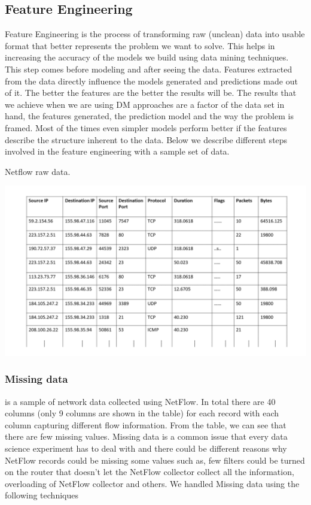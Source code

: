 \subsection{Feature Engineering}

Feature Engineering is the process of transforming raw (unclean)
data into usable format that better represents the problem we want to solve. This helps in increasing the accuracy of the models we build using data mining techniques. This step comes before modeling and after seeing the data.
Features extracted from the data directly influence the models generated and predictions made out of it. The better the features are the better the results will be. The results that we achieve when we are using DM approaches are a factor of the data set in hand, the features generated, the prediction model and the way the problem is framed. Most of the times even simpler models perform better if the features describe the structure inherent to the data. 
Below we describe different steps involved in the feature engineering with a sample set of data.
\begin{table}[t]
	\caption{Netflow raw data.}%
	\centerline{\includegraphics[scale = 0.5]{raw_data.pdf}}	
\end{table}
 
\subsubsection{Missing data} 

 is a sample of network data collected using NetFlow. In total there are 40 columns (only 9 columns are shown in the table) for each record with each column capturing different flow information. From the table, we can see that there are few missing values. Missing data is a common issue that every data science experiment has to deal with and there could be different reasons why NetFlow records could be missing some values such as, few filters could be turned on the router that doesn't let the NetFlow collector collect all the information, overloading of NetFlow collector and others. We handled Missing data using the following techniques 


